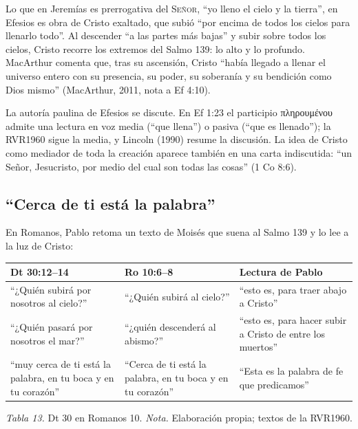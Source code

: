 \documentclass[11pt,letterpaper]{article}
\newcommand{\grc}[1]{\foreignlanguage{ancientgreek}{#1}}
\newcommand{\SENOR}{\textsc{Señor}}
\begin{document}
Lo que en Jeremías es prerrogativa del \SENOR{}, ``yo lleno el cielo y la tierra'', en Efesios es obra de Cristo exaltado, que subió ``por encima de todos los cielos para llenarlo todo''. Al descender ``a las partes más bajas'' y subir sobre todos los cielos, Cristo recorre los extremos del Salmo 139: lo alto y lo profundo. MacArthur comenta que, tras su ascensión, Cristo ``había llegado a llenar el universo entero con su presencia, su poder, su soberanía y su bendición como Dios mismo'' (MacArthur, 2011, nota a Ef 4:10).

\begin{nota}[Precisión]
La autoría paulina de Efesios se discute. En Ef 1:23 el participio \grc{πληρουμένου} admite una lectura en voz media (``que llena'') o pasiva (``que es llenado''); la RVR1960 sigue la media, y Lincoln (1990) resume la discusión. La idea de Cristo como mediador de toda la creación aparece también en una carta indiscutida: ``un Señor, Jesucristo, por medio del cual son todas las cosas'' (1 Co 8:6).
\end{nota}

\subsection{``Cerca de ti está la palabra''}

En Romanos, Pablo retoma un texto de Moisés que suena al Salmo 139 y lo lee a la luz de Cristo:

\begin{center}\small\renewcommand{\arraystretch}{1.22}
\begin{tabular}{@{}L{4.6cm}L{4.6cm}L{4.8cm}@{}}
\toprule
\textbf{Dt 30:12--14} & \textbf{Ro 10:6--8} & \textbf{Lectura de Pablo} \\ \midrule
``¿Quién subirá por nosotros al cielo?'' & ``¿Quién subirá al cielo?'' & ``esto es, para traer abajo a Cristo'' \\
``¿Quién pasará por nosotros el mar?'' & ``¿quién descenderá al abismo?'' & ``esto es, para hacer subir a Cristo de entre los muertos'' \\
``muy cerca de ti está la palabra, en tu boca y en tu corazón'' & ``Cerca de ti está la palabra, en tu boca y en tu corazón'' & ``Esta es la palabra de fe que predicamos'' \\
\bottomrule
\end{tabular}\par
{\footnotesize\color{gris}\textit{Tabla 13.} Dt 30 en Romanos 10. \textit{Nota.} Elaboración propia; textos de la RVR1960.}
\end{center}
\end{document}
